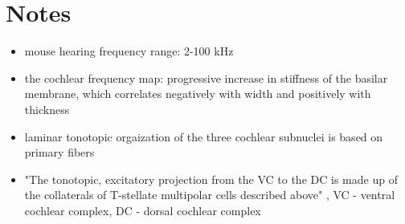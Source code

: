 \chapter{Notes}\label{Notes}
\begin{itemize}
    \item mouse hearing frequency range: 2-100 kHz \parencite{malmiercaAuditorySystem2012}
    \item the cochlear frequency map: progressive increase in stiffness of the basilar membrane, which correlates negatively with width and positively with thickness \parencite{malmiercaAuditorySystem2012}
    \item laminar tonotopic orgaization of the three cochlear subnuclei is based on primary fibers \parencite{malmiercaAuditorySystem2012}
    \item "The tonotopic, excitatory projection from the VC to the DC is made up of the collaterals of T-stellate multipolar cells described above" \parencite{malmiercaAuditorySystem2012}, VC - ventral cochlear complex, DC - dorsal cochlear complex
\end{itemize}